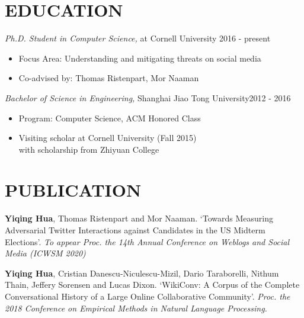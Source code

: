 \documentclass[margin, 10pt]{res} %
\begin{document}
\begin{resume}



\section{EDUCATION}

{\sl Ph.D. Student in Computer Science,} at Cornell University \hfill 2016 - present \\
\begin{itemize}
\item Focus Area: Understanding and mitigating threats on social media
\item Co-advised by: Thomas Ristenpart, Mor Naaman
\end{itemize}
{\sl Bachelor of Science in Engineering,} Shanghai Jiao Tong University\hfill 2012 - 2016\\
\begin{itemize}
\item Program: Computer Science, ACM Honored Class
\item Visiting scholar at Cornell University (Fall 2015) \\with scholarship from Zhiyuan College
\end{itemize}


\section{PUBLICATION}

\textbf{Yiqing Hua}, Thomas Ristenpart and Mor Naaman.
`Towards Measuring Adversarial Twitter Interactions against Candidates in the US Midterm Elections'.
\textit{To appear Proc. the 14th Annual Conference on Weblogs and Social Media (ICWSM 2020)}

\textbf{Yiqing Hua}, Cristian Danescu-Niculescu-Mizil, Dario Taraborelli, Nithum Thain, Jeffery Sorensen and Lucas Dixon.
`WikiConv: A Corpus of the Complete Conversational History of a Large Online Collaborative Community'.
\textit{Proc. the 2018 Conference on Empirical Methods in Natural Language Processing.}


\end{resume}
\end{document}
